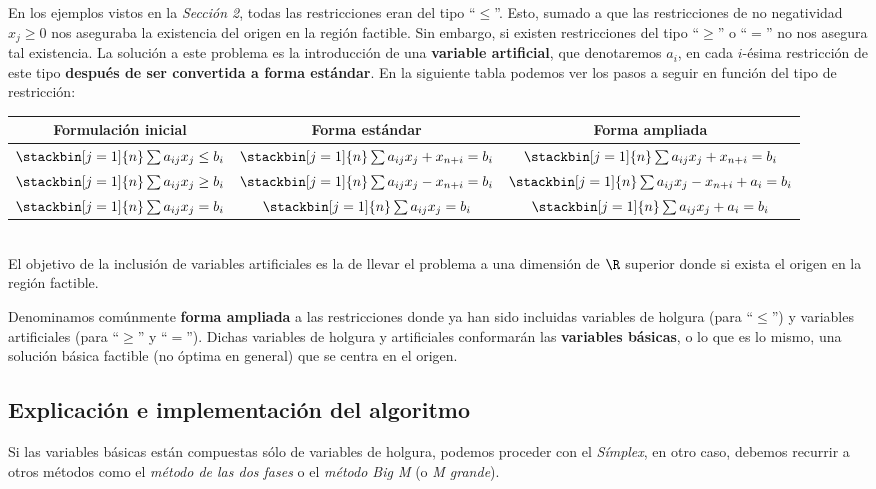 En los ejemplos vistos en la \textit{Sección 2}, todas las restricciones eran del tipo ``$\leq$''. Esto, sumado a que las restricciones de no negatividad $x_j\geq0$ nos aseguraba la existencia del origen en la región factible. Sin embargo, si existen restricciones del tipo ``$\geq$'' o ``$=$'' no nos asegura tal existencia. La solución a este problema es la introducción de una \textbf{variable artificial}, que denotaremos $a_i$, en cada $i$-ésima restricción de este tipo \textbf{después de ser convertida a forma estándar}. En la siguiente tabla podemos ver los pasos a seguir en función del tipo de restricción:
\begin{center}\begin{tabular}{|c|c|c|} \hline
Formulación inicial & Forma estándar & Forma ampliada\\\hline\hline
$\stackbin[j=1]{n}\sum a_{ij}x_j\leq b_i$&$\stackbin[j=1]{n}\sum a_{ij}x_j+x_{n+i}= b_i$&$\stackbin[j=1]{n}\sum a_{ij}x_j+x_{n+i}= b_i$\\\hline
$\stackbin[j=1]{n}\sum a_{ij}x_j\geq b_i$&$\stackbin[j=1]{n}\sum a_{ij}x_j-x_{n+i}= b_i$&$\stackbin[j=1]{n}\sum a_{ij}x_j-x_{n+i}+a_i=b_i$\\\hline
$\stackbin[j=1]{n}\sum a_{ij}x_j=b_i$&$\stackbin[j=1]{n}\sum a_{ij}x_j= b_i$&$\stackbin[j=1]{n}\sum a_{ij}x_j+a_i= b_i$\\\hline
\end{tabular}\end{center}\ \\

El objetivo de la inclusión de variables artificiales es la de llevar el problema a una dimensión de $\R$ superior donde si exista el origen en la región factible.

Denominamos comúnmente \textbf{forma ampliada} a las restricciones donde ya han sido incluidas variables de holgura (para ``$\leq$'') y variables artificiales (para ``$\geq$'' y ``$=$'').
Dichas variables de holgura y artificiales conformarán las \textbf{variables básicas}, o lo que es lo mismo, una solución básica factible (no óptima en general) que se centra en el origen.

\subsection{Explicación e implementación del algoritmo}

Si las variables básicas están compuestas sólo de variables de holgura, podemos proceder con el \textit{Símplex}, en otro caso, debemos recurrir a otros métodos como el \textit{método de las dos fases} o el \textit{método Big M} (o \textit{M grande}).\\

